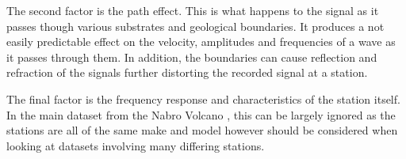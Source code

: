 \documentclass[../report.tex]{subfiles}
\begin{document}
	The second factor is the path effect.  This is what happens to the signal as it passes though various substrates and geological boundaries.  It produces a not easily predictable effect on the velocity, amplitudes and frequencies of a wave as it passes through them.  In addition, the boundaries can cause reflection and refraction of the signals further distorting the recorded signal at a station.
	
	The final factor is the frequency response and characteristics of the station itself.  In the main dataset from the Nabro Volcano \citep{eritrea1}, this can be largely ignored as the stations are all of the same make and model however should be considered when looking at datasets involving many differing stations.
\end{document}
